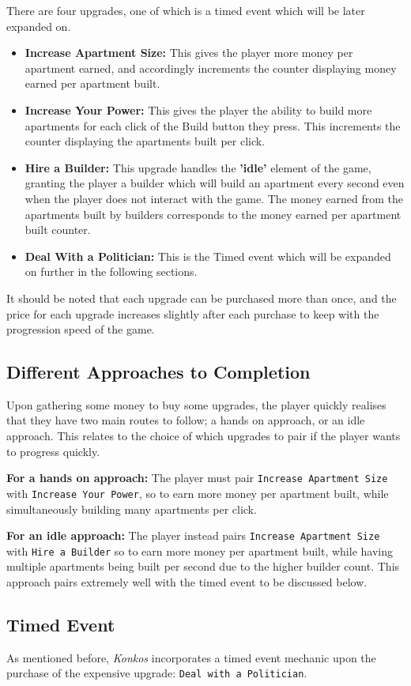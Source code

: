 \documentclass{article}
\begin{document}
There are four upgrades, one of which is a timed event which will be later expanded on. 
\begin{itemize}
    \item \textbf{Increase Apartment Size:} This gives the player more money per apartment earned, and accordingly increments the counter displaying money earned per apartment built.
    \item \textbf{Increase Your Power:} This gives the player the ability to build more apartments for each click of the Build button they press. This increments the counter displaying the apartments built per click.
    \item \textbf{Hire a Builder:} This upgrade handles the \textbf{'idle'} element of the game, granting the player a builder which will build an apartment every second even when the player does not interact with the game. The money earned from the apartments built by builders corresponds to the money earned per apartment built counter.
    \item \textbf{Deal With a Politician:} This is the Timed event which will be expanded on further in the following sections.
\end{itemize}

It should be noted that each upgrade can be purchased more than once, and the price for each upgrade increases slightly after each purchase to keep with the progression speed of the game. 
\subsection*{Different Approaches to Completion}

Upon gathering some money to buy some upgrades, the player quickly realises that they have two main routes to follow; a hands on approach, or an idle approach. This relates to the choice of which upgrades to pair if the player wants to progress quickly.

\textbf{For a hands on approach:}
The player must pair \texttt{Increase Apartment Size} with \texttt{Increase Your Power}, so to earn more money per apartment built, while simultaneously building many apartments per click.

\textbf{For an idle approach:}
The player instead pairs \texttt{Increase Apartment Size} with \texttt{Hire a Builder} so to earn more money per apartment built, while having multiple apartments being built per second due to the higher builder count. This approach pairs extremely well with the timed event to be discussed below.
\subsection*{Timed Event}
As mentioned before, \textit{Konkos} incorporates a timed event mechanic upon the purchase of the expensive upgrade: \texttt{Deal with a Politician}.
\end{document}
